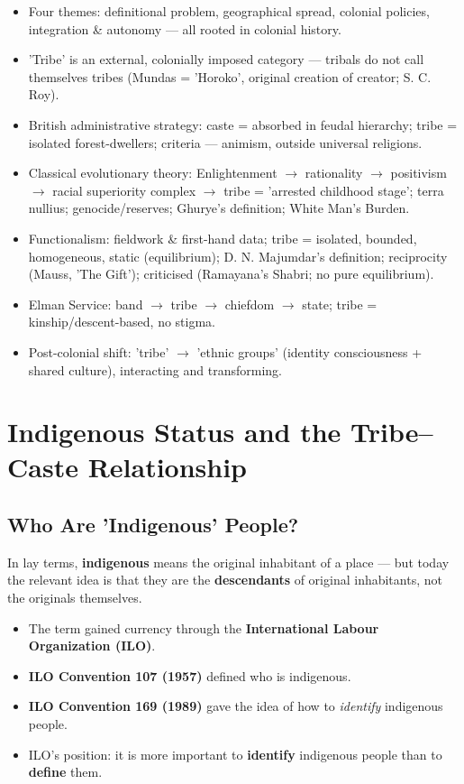 \begin{QuickRevision}
\begin{itemize}
\item Four themes: definitional problem, geographical spread, colonial policies, integration \& autonomy --- all rooted in colonial history.
\item 'Tribe' is an external, colonially imposed category --- tribals do not call themselves tribes (Mundas = 'Horoko', original creation of creator; S. C. Roy).
\item British administrative strategy: caste = absorbed in feudal hierarchy; tribe = isolated forest-dwellers; criteria --- animism, outside universal religions.
\item Classical evolutionary theory: Enlightenment $\rightarrow$ rationality $\rightarrow$ positivism $\rightarrow$ racial superiority complex $\rightarrow$ tribe = 'arrested childhood stage'; terra nullius; genocide/reserves; Ghurye's definition; White Man's Burden.
\item Functionalism: fieldwork \& first-hand data; tribe = isolated, bounded, homogeneous, static (equilibrium); D. N. Majumdar's definition; reciprocity (Mauss, 'The Gift'); criticised (Ramayana's Shabri; no pure equilibrium).
\item Elman Service: band $\rightarrow$ tribe $\rightarrow$ chiefdom $\rightarrow$ state; tribe = kinship/descent-based, no stigma.
\item Post-colonial shift: 'tribe' $\rightarrow$ 'ethnic groups' (identity consciousness + shared culture), interacting and transforming.
\end{itemize}
\end{QuickRevision}

\section{Indigenous Status and the Tribe--Caste Relationship}

\subsection{Who Are 'Indigenous' People?}

In lay terms, \textbf{indigenous} means the original inhabitant of a place --- but today the relevant idea is that they are the \textbf{descendants} of original inhabitants, not the originals themselves.

\begin{GovtPolicy}
\begin{itemize}
\item The term gained currency through the \textbf{International Labour Organization (ILO)}.
\item \textbf{ILO Convention 107 (1957)} defined who is indigenous.
\item \textbf{ILO Convention 169 (1989)} gave the idea of how to \emph{identify} indigenous people.
\item ILO's position: it is more important to \textbf{identify} indigenous people than to \textbf{define} them.
\end{itemize}
\end{GovtPolicy}

